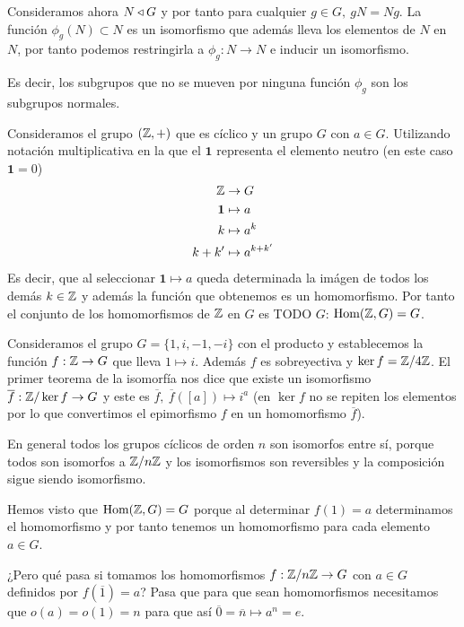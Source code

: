 \begin{ej}
	Consideramos ahora $N \mathbin{\triangleleft} G$ y por tanto para cualquier $g \in G,\ gN = Ng$. La función $\phi_g(N) \subset N$ es un isomorfismo que además lleva los elementos de $N$ en $N$, por tanto podemos restringirla a $\phi_g:N \to N$ e inducir un isomorfismo.
	
	Es decir, los subgrupos que no se mueven por ninguna función $\phi_g$ son los subgrupos normales.
\end{ej}

\begin{ej}
	Consideramos el grupo $(\mathbb{Z}, +)$ que es cíclico y un grupo $G$ con $a \in G$. Utilizando notación multiplicativa en la que el $\mathbf{1}$ representa el elemento neutro (en este caso $\mathbf{1} = 0$)
	\begin{align*}
	\mathbb{Z} &\to G \\
	\mathbf{1} &\mapsto a \\
	k &\mapsto a^k \\
	k + k' &\mapsto a^{k+k'}
	\end{align*}
	Es decir, que al seleccionar $\mathbf{1} \mapsto a$ queda determinada la imágen de todos los demás $k \in \mathbb{Z}$ y además la función que obtenemos es un homomorfismo. Por tanto el conjunto de los homomorfismos de $\mathbb{Z}$ en $G$ es TODO $G$: $\text{Hom}(\mathbb{Z}, G) = G$.
\end{ej}

\begin{ej}
	Consideramos el grupo $G = \{1, i, -1, -i\}$ con el producto y establecemos la función $f:\mathbb{Z} \to G$ que lleva $1 \mapsto i$. Además $f$ es sobreyectiva y $\ker f = \mathbb{Z}/4\mathbb{Z}$. El primer teorema de la isomorfía nos dice que existe un isomorfismo $\overline{f}: \mathbb{Z}/\ker f \to G$ y este es $\overline{f},\ \overline{f}([a]) \mapsto i^{a}$ (en $\ker f$ no se repiten los elementos por lo que convertimos el epimorfismo $f$ en un homomorfismo $\overline{f}$).
\end{ej}

En general todos los grupos cíclicos de orden $n$ son isomorfos entre sí, porque todos son isomorfos a $\mathbb{Z}/n\mathbb{Z}$ y los isomorfismos son reversibles y la composición sigue siendo isomorfismo.

Hemos visto que $\text{Hom}(\mathbb{Z}, G) = G$ porque al determinar $f(1) = a$ determinamos el homomorfismo y por tanto tenemos un homomorfismo para cada elemento $a \in G$.

¿Pero qué pasa si tomamos los homomorfismos $f:\mathbb{Z}/n\mathbb{Z} \to G$ con $a \in G$ definidos por $f(\overline{1}) = a$? Pasa que para que sean homomorfismos necesitamos que $o(a) = o(1) = n$ para que así $\overline{0} = \overline{n} \mapsto a^n = e$.

